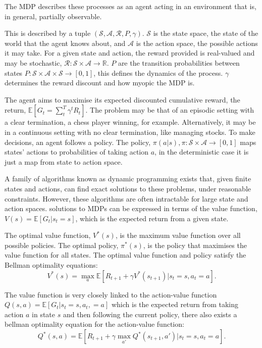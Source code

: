 The MDP describes these processes as an agent acting in an environment that is, in general, partially observable.

This is described by a tuple $(\mathcal{S}, \mathcal{A}, \mathcal{R}, P, \gamma)$. $\mathcal{S}$ is the state space, the state of the world that the agent knows about, and $\mathcal{A}$ is the action space, the possible actions it may take. For a given state and action, the reward provided is real-valued and may be stochastic, $\mathcal{R}: \mathcal{S} \times \mathcal{A} \rightarrow \mathbb{R}$. $P$ are the transition probabilities between states $P: \mathcal{S} \times \mathcal{A} \times \mathcal{S} \rightarrow [0, 1]$, this defines the dynamics of the process. $\gamma $ determines the reward discount and how myopic the MDP is.

The agent aims to maximise its expected discounted cumulative reward, the return, $ \mathbb{E} [ G_t = \sum_t^T \gamma^t R_t ] $. The problem may be that of an episodic setting with a clear termination, a chess player winning, for example. Alternatively, it may be in a continuous setting with no clear termination, like managing stocks. To make decisions, an agent follows a policy. The policy, $\pi(a|s), \pi: \mathcal{S} \times \mathcal{A} \rightarrow [0, 1]$ maps states' actions to probabilities of taking action $a$, in the deterministic case it is just a map from state to action space.


A family of algorithms known as dynamic programming exists that, given finite states and actions, can find exact solutions to these problems, under reasonable constraints. However, these algorithms are often intractable for large state and action spaces.
solutions to MDPs can be expressed in terms of the value function, $V(s) = \mathbb{E} [ G_t | s_t = s]$, which is the expected return from a given state. 

The optimal value function, $V^*(s)$, is the maximum value function over all possible policies. The optimal policy, $\pi^*(s)$, is the policy that maximises the value function for all states. The optimal value function and policy satisfy the Bellman optimality equations\cite{bellamn1957mdp}:
\begin{equation}
	V^*(s) = \max_a \mathbb{E} [ R_{t+1} + \gamma V^*(s_{t+1}) | s_t = s, a_t = a].
\end{equation}

The value function is very closely linked to the action-value function $Q(s, a) = \mathbb{E} [G_t | s_t=s, a_t,=a]$ which is the expected return from taking action $a$ in state $s$ and then following the current policy, there also exists a bellman optimality equation for the action-value function:
\begin{equation}
	Q^*(s,a) = \mathbb{E} [ R_{t+1} + \gamma \max_{a'} Q^*(s_{t+1}, a') | s_t = s, a_t = a].
\end{equation}

